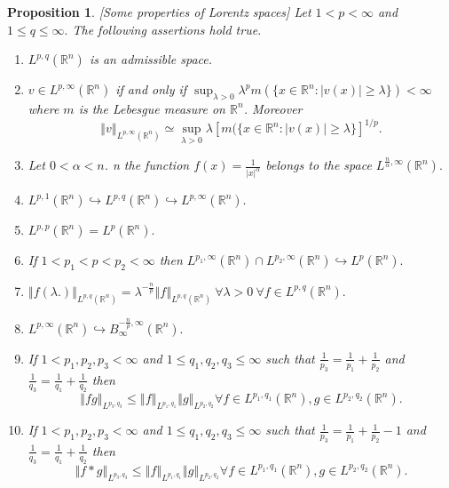 \documentclass[10pt,a4paper]{amsart}
\newtheorem{proposition}{Proposition}
\begin{document}
\begin{proposition}\label{lorentz} [Some properties of Lorentz spaces]
Let $1<p<\infty $ and $1\leq q\leq \infty .$ The following assertions hold true.
\begin{enumerate}
\item $L^{p,q}(\mathbb{R}^{n})$ is an admissible space.
\item $v\in L^{p,\infty }(\mathbb{R}^{n})$ if and only if $\sup_{\lambda
>0}\lambda ^{p}m(\{x\in \mathbb{R}^{n}:\left\vert v(x)\right\vert \geq
\lambda \})<\infty $ where $m$ is the Lebesgue measure on $\mathbb{R}^{n}$. Moreover
\[
\left\Vert v\right\Vert_{L^{p,\infty }(\mathbb{R}^{n})}\simeq \sup_{\lambda
>0}\lambda [m(\{x\in \mathbb{R}^{n}:\left\vert v(x)\right\vert \geq
\lambda \}]^{1/p}.
\]
\item Let $0<\alpha <n$. n the  function $f(x)=\frac{1}{\left\vert x\right\vert ^{\alpha }%
}$ belongs to the space $L^{\frac{n}{\alpha },\infty }(%
\mathbb{R}^{n}).$

\item $L^{p,1}(\mathbb{R}^{n})\hookrightarrow L^{p,q}(\mathbb{R}%
^{n})\hookrightarrow L^{p,\infty }(\mathbb{R}^{n}).$

\item $L^{p,p}(\mathbb{R}^{n})=L^{p}(\mathbb{R}^{n}).$
\item If $1<p_1<p<p_2<\infty$ then $L^{p_1,\infty}(\mathbb{R}^n)\cap L^{p_2,\infty}(\mathbb{R}^n) \hookrightarrow L^p(\mathbb{R}^{n}).$

\item $\left\Vert f(\lambda .)\right\Vert _{L^{p,q}(\mathbb{R}^{n})}=\lambda
^{-\frac{n}{p}}\left\Vert f\right\Vert _{L^{p,q}(\mathbb{R}^{n})}~\forall
\lambda >0~\forall f\in L^{p,q}(\mathbb{R}^{n}).$

\item $L^{p,\infty }(\mathbb{R}^{n})\hookrightarrow B_{\infty }^{-\frac{n}{p}%
,\infty }(\mathbb{R}^{n}).$

\item If $1<p_{1},p_{2},p_{3}<\infty $ and $1\leq q_{1},q_{2},q_{3}\leq
\infty $ such that $\frac{1}{p_{3}}=\frac{1}{p_{1}}+\frac{1}{p_{2}}$ and $%
\frac{1}{q_{3}}=\frac{1}{q_{1}}+\frac{1}{q_{2}}$ then%
\[
\left\Vert fg\right\Vert _{L^{p_{3},q_{3}}}\leq \left\Vert f\right\Vert
_{L^{p_{1},q_{1}}}\left\Vert g\right\Vert _{L^{p_{2},q_{2}}}\forall f\in
L^{p_{1},q_{1}}(\mathbb{R}^{n}),g\in L^{p_{2},q_{2}}(\mathbb{R}^{n}).
\]

\item If $1<p_{1},p_{2},p_{3}<\infty $ and $1\leq q_{1},q_{2},q_{3}\leq
\infty $ such that $\frac{1}{p_{3}}=\frac{1}{p_{1}}+\frac{1}{p_{2}}-1$ and $%
\frac{1}{q_{3}}=\frac{1}{q_{1}}+\frac{1}{q_{2}}$ then%
\[
\left\Vert f\ast g\right\Vert _{L^{p_{3},q_{3}}}\leq \left\Vert f\right\Vert
_{L^{p_{1},q_{1}}}\left\Vert g\right\Vert _{L^{p_{2},q_{2}}}\forall f\in
L^{p_{1},q_{1}}(\mathbb{R}^{n}),g\in L^{p_{2},q_{2}}(\mathbb{R}^{n}).
\]
\end{enumerate}
\end{proposition}
\end{document}
